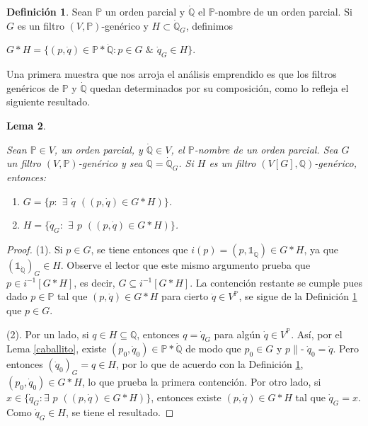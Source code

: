 \documentclass[11pt]{unam_tesis1}
\theoremstyle{MyThmStyle}
\theoremstyle{definition}
\newtheorem{definition}{Definici\'on}[chapter]
\theoremstyle{plain}
\newtheorem{lemma}[definition]{Lema}
\theoremstyle{remark}
\def\forces{\mathop{\parallel\!\!\!-}\nolimits}
\let\Vdash\forces
\begin{document}
\begin{definition}\label{iteracionfiltros}
Sean $\mathbb P$ un orden parcial y $\dot{\mathbb Q}$ el $\mathbb P$-nombre de un orden parcial. Si $G$ es un filtro $(V,\mathbb P)$-gen\'erico y $H\subset \dot {\mathbb Q}_G$, definimos
\begin{center}
$G*H=\{(p, \dot q )\in \mathbb P*\dot{\mathbb Q}: p\in G$ $\&$ $\dot q_G \in H \}$.
\end{center}
\end{definition}

Una primera muestra que nos arroja el an\'alisis emprendido es que los filtros gen\'ericos de $\mathbb P$ y $\dot{\mathbb Q}$ quedan determinados por su composici\'on, como lo refleja el siguiente resultado.

\begin{lemma}\label{igualdadgenericos}

Sean $\mathbb P\in V$, un orden parcial, y $\dot{\mathbb Q}\in V$, el $\mathbb P$-nombre de un orden parcial. Sea $G$ un filtro $(V,\mathbb P)$-gen\'erico y sea $\mathbb Q=\dot{\mathbb Q}_G$. Si $H$ es un filtro $(V[G], \mathbb Q)$-gen\'erico, entonces:

\begin{enumerate}
\item $G=\{p:$ $\exists$  $\dot q$ $((p,\dot q)\in G*H) \}$.
\item $H=\{\dot q_G:$ $\exists$ $p$ $((p,\dot q)\in G*H) \}$.
\end{enumerate}

\end{lemma}

\begin{proof}
(1). Si $p\in G$, se tiene entonces que $i(p)=(p,\mathds 1_{\dot{\mathbb Q}})\in G*H$, ya que $(\mathds 1_{\dot{\mathbb Q}})_G\in H$. Observe el lector que este mismo argumento prueba que $p\in i^{-1}[G*H]$, es decir, $G\subseteq i^{-1}[G*H]$. La contenci\'on restante se cumple pues dado $p\in \mathbb P$ tal que $(p,\dot q)\in G*H$ para cierto $\dot q\in V^{\mathbb P}$, se sigue de la Definici\'on \ref{iteracionfiltros} que $p\in G$.

(2). Por un lado, si $q\in H\subseteq \mathbb Q$, entonces $q=\dot q_G$ para alg\'un $\dot q\in V^{\mathbb P}$. As\'i, por el Lema \ref{caballito}, existe $(p_0,\dot q_0)\in \mathbb P*\dot{\mathbb Q}$ de modo que $p_0\in G$ y $p\Vdash \dot q_0=\dot q$. Pero entonces $(\dot q_0)_G =q\in H$, por lo que de acuerdo con la Definici\'on \ref{iteracionfiltros}, $(p_0,\dot q_0)\in G*H$, lo que prueba la primera contenci\'on. Por otro lado, si $x\in \{\dot q_G:\exists$ $p$ $((p,\dot q)\in G*H) \}$, entonces existe $(p,\dot q)\in G*H$ tal que $\dot q_G=x$. Como $\dot q_G\in H$, se tiene el resultado.
\end{proof}
\end{document}
